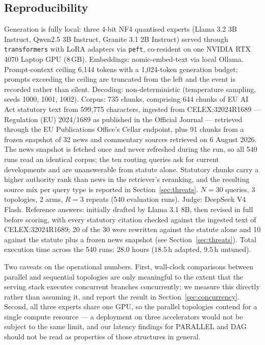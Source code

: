 \documentclass[journal,10pt,compsoc,onecolumn]{IEEEtran}
\begin{document}
\subsection{Reproducibility}
Generation is fully local: three 4-bit NF4 quantised experts (Llama 3.2 3B
Instruct, Qwen2.5 3B Instruct, Granite 3.1 2B Instruct) served through
\texttt{transformers} with LoRA adapters via \texttt{peft}, co-resident on one
NVIDIA RTX 4070 Laptop GPU (8\,GB). Embeddings: nomic-embed-text via local
Ollama. Prompt-context ceiling 6,144 tokens with a 1,024-token generation budget;
prompts exceeding the ceiling are truncated from the left and the event is
recorded rather than silent. Decoding: non-deterministic (temperature sampling,
seeds 1000, 1001, 1002). Corpus: 735 chunks, comprising 644 chunks of EU AI Act
statutory text from 599{,}775 characters, ingested from CELEX:32024R1689 ---
Regulation (EU) 2024/1689 as published in the Official Journal --- retrieved
through the EU Publications Office's Cellar endpoint, plus 91 chunks from a
frozen snapshot of 32 news and commentary sources retrieved on 6 August 2026.
The news snapshot is fetched once and never refreshed during the run, so all 540
runs read an identical corpus; the ten routing queries ask for current
developments and are unanswerable from statute alone. Statutory chunks carry a
higher authority rank than news in the retriever's reranking, and the resulting
source mix per query type is reported in Section~\ref{sec:threats}. $N=30$ queries, 3 topologies, 2 arms, $R=3$ repeats
(540 evaluation runs). Judge: DeepSeek V4 Flash. Reference answers: initially
drafted by Llama 3.1 8B, then revised in full before scoring, with every
statutory citation checked against the ingested text of CELEX:32024R1689; 20 of
the 30 were rewritten against the statute alone and 10 against the statute plus
a frozen news snapshot (see Section~\ref{sec:threats}). Total execution time
across the 540 runs: $28.0$ hours ($18.5$\,h adapted, $9.5$\,h untuned).

Two caveats on the operational numbers. First, wall-clock comparisons between
parallel and sequential topologies are only meaningful to the extent that the
serving stack executes concurrent branches concurrently; we measure this directly
rather than assuming it, and report the result in Section~\ref{sec:concurrency}.
Second, all three experts share one GPU, so the parallel topologies contend for a
single compute resource --- a deployment on three accelerators would not be
subject to the same limit, and our latency findings for PARALLEL and DAG should
not be read as properties of those structures in general.
\end{document}
